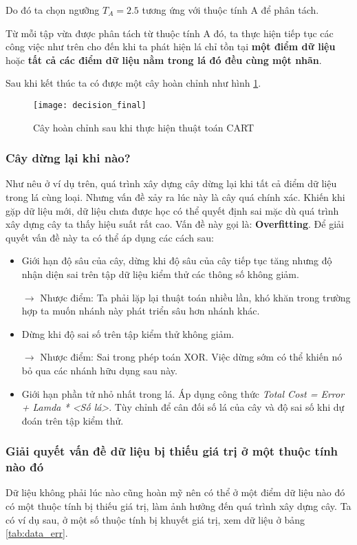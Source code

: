 \documentclass[../main-report.tex]{subfiles}
\begin{document}
Do đó ta chọn ngưỡng $T_A = 2.5$ tương ứng với thuộc tính A để phân tách.

Từ mỗi tập vừa được phân tách từ thuộc tính A đó, ta thực hiện tiếp tục các công việc như trên cho đến khi ta phát hiện lá chỉ tồn tại\textbf{ một điểm dữ liệu} hoặc \textbf{tất cả các điểm dữ liệu nằm trong lá đó đều cùng một nhãn}.

Sau khi kết thúc ta có được một cây hoàn chỉnh như hình \ref{fig:decision_tree_final}.

\begin{figure}[ht!]
\centering\texttt{[image: decision\_final]}
\caption{Cây hoàn chỉnh sau khi thực hiện thuật toán CART}
\label{fig:decision_tree_final}
\end{figure}

\subsubsection*{Cây dừng lại khi nào?}
\label{sec:stop_trees}
Như nêu ở ví dụ trên, quá trình xây dựng cây dừng lại khi tất cả điểm dữ liệu trong lá cùng loại. Nhưng vấn đề xảy ra lúc này là cây quá chính xác. Khiến khi gặp dữ liệu mới, dữ liệu chưa  được học có thể quyết định sai mặc dù quá trình xây dựng cây ta thấy hiệu suất rất cao. Vấn đề này gọi là: \textbf{Overfitting}. Để giải quyết vấn đề này ta có thể áp dụng các cách sau:

\begin{itemize}
\item Giới hạn độ sâu của cây, dừng khi độ sâu của cây tiếp tục tăng nhưng độ nhận diện sai trên tập dữ liệu kiểm thử các thông số không giảm. 

$\to$ Nhược điểm: Ta phải lặp lại thuật toán nhiều lần, khó khăn trong trường hợp ta muốn nhánh này phát triển sâu hơn nhánh khác.
\item Dừng khi độ sai số trên tập kiểm thử không giảm.

$\to$ Nhược điểm: Sai trong phép toán XOR. Việc dừng sớm có thể khiến nó bỏ qua các nhánh hữu dụng sau này.
\item Giới hạn phần tử nhỏ nhất trong lá. Áp dụng công thức \emph{Total Cost = Error + Lamda * <Số lá>}. Tùy chỉnh để cân đối số lá của cây và độ sai số khi dự đoán trên tập kiểm thử.
\end{itemize}

\subsubsection*{Giải quyết vấn đề dữ liệu bị thiếu giá trị ở một thuộc tính nào đó}
Dữ liệu không phải lúc nào cũng hoàn mỹ nên có thể ở một điểm dữ liệu nào đó có một thuộc tính bị thiếu giá trị, làm ảnh hưởng đến quá trình xây dựng cây. Ta có ví dụ sau, ở một số thuộc tính bị khuyết giá trị, xem dữ liệu ở bảng \ref{tab:data_err}.
\end{document}

